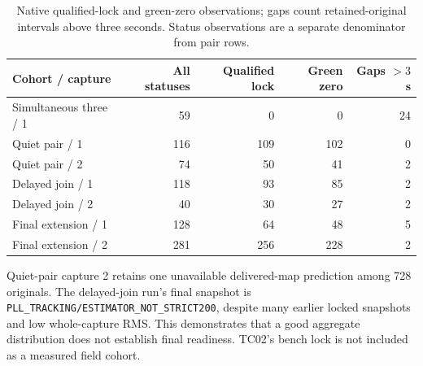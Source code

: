 \documentclass[11pt,letterpaper]{article}
\newcommand{\code}[1]{\texttt{\small #1}}
\begin{document}
\begin{table}[h]\centering\small
\caption{Native qualified-lock and green-zero observations; gaps count retained-original intervals above three seconds. Status observations are a separate denominator from pair rows.}\label{tab:state}
\begin{tabular}{@{}lrrrr@{}}\toprule
Cohort / capture & All statuses & Qualified lock & Green zero & Gaps $>3$ s\\\midrule
Simultaneous three / 1 &59&0&0&24\\
Quiet pair / 1 &116&109&102&0\\
Quiet pair / 2 &74&50&41&2\\
Delayed join / 1 &118&93&85&2\\
Delayed join / 2 &40&30&27&2\\
Final extension / 1 &128&64&48&5\\
Final extension / 2 &281&256&228&2\\\bottomrule
\end{tabular}
\end{table}

Quiet-pair capture 2 retains one unavailable delivered-map prediction among 728 originals. The delayed-join run's final snapshot is \code{PLL\_TRACKING/ESTIMATOR\_NOT\_STRICT200}, despite many earlier locked snapshots and low whole-capture RMS. This demonstrates that a good aggregate distribution does not establish final readiness. TC02's bench lock is not included as a measured field cohort.
\end{document}
